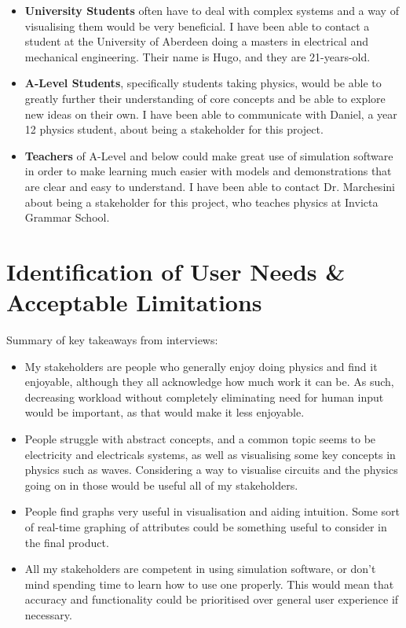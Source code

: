     \begin{itemize}
        \item \textbf{University Students} often have to deal with complex systems and a way of visualising them would be very beneficial. I have been able to contact a student at the University of Aberdeen doing a masters in electrical and mechanical engineering. Their name is Hugo, and they are 21-years-old.
        \item \textbf{A-Level Students}, specifically students taking physics,  would be able to greatly further their understanding of core concepts and be able to explore new ideas on their own. I have been able to communicate with Daniel, a year 12 physics student, about being a stakeholder for this project.
        \item \textbf{Teachers} of A-Level and below could make great use of simulation software in order to make learning much easier with models and demonstrations that are clear and easy to understand. I have been able to contact Dr. Marchesini about being a stakeholder for this project, who teaches physics at Invicta Grammar School.
    \end{itemize}

\section{Identification of User Needs \& Acceptable Limitations}

    Summary of key takeaways from interviews:
    \begin{itemize}
        \item My stakeholders are people who generally enjoy doing physics and find it enjoyable, although they all acknowledge how much work it can be. As such, decreasing workload without completely eliminating need for human input would be important, as that would make it less enjoyable.
        \item People struggle with abstract concepts, and a common topic seems to be electricity and electricals systems, as well as visualising some key concepts in physics such as waves. Considering a way to visualise circuits and the physics going on in those would be useful all of my stakeholders.
        \item People find graphs very useful in visualisation and aiding intuition. Some sort of real-time graphing of attributes could be something useful to consider in the final product.
        \item All my stakeholders are competent in using simulation software, or don't mind spending time to learn how to use one properly. This would mean that accuracy and functionality could be prioritised over general user experience if necessary. 
    \end{itemize}

